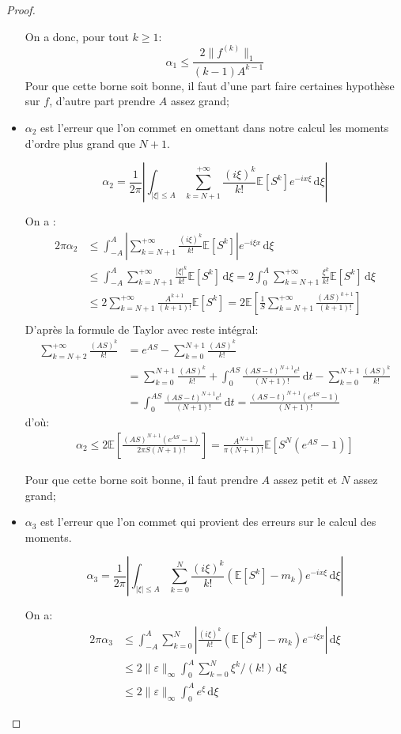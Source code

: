 \documentclass[12pt]{article}
\newcommand{\pth}[1]{\left(#1\right)}
\newcommand{\cro}[1]{\left[#1\right]}
\newcommand{\abs}[1]{\left|#1\right|}
\newcommand{\dabs}[1]{\|#1\|}
\newcommand{\de}{\,\mathrm{d}}
\newcommand{\Esp}[1]{\mathbb{E}\cro{#1}}
\begin{document}
\begin{proof}
\begin{itemize}
  On a donc, pour tout $k\geqslant 1$:
  \[\alpha_1\leqslant\frac{2\dabs{f^{(k)}}_{1}}{(k-1)A^{k-1}}\] Pour que cette borne soit bonne, il faut d'une part faire certaines hypothèse sur $f$, d'autre part prendre $A$ assez grand;
\item $\alpha_2$ est l'erreur que l'on commet en omettant dans notre calcul les moments d'ordre plus grand que $N+1$.

\[\alpha_2 = \frac1{2\pi}\abs{\int_{\abs{\xi}\leqslant A}\sum_{k=N+1}^{+\infty}\frac{(i\xi)^k}{k!}\Esp{S^k}e^{-ix\xi}\de\xi}\]

On a :
  \begin{align*}
    2\pi\alpha_2&\leqslant \int_{-A}^A\abs{\sum_{k=N+1}^{+\infty}\frac{(i\xi)^k}{k!}\Esp{S^k}}e^{-i\xi x}\de\xi\\
    &\leqslant  \int_{-A}^A\sum_{k=N+1}^{+\infty}\frac{\abs{\xi}^k}{k!}\Esp{S^k}\de\xi=2 \int_{0}^A\sum_{k=N+1}^{+\infty}\frac{\xi^k}{k!}\Esp{S^k}\de\xi\\
    &\leqslant 2\sum_{k=N+1}^{+\infty}\frac{A^{k+1}}{(k+1)!}\Esp{S^k}=2\Esp{\frac{1}{S}\sum_{k=N+1}^{+\infty}\frac{(AS)^{k+1}}{(k+1)!}}\\
  \end{align*}
  D'après la formule de Taylor avec reste intégral:
  \begin{align*}
    \sum_{k=N+2}^{+\infty}\frac{(AS)^{k}}{k!}&=e^{AS}-\sum_{k=0}^{N+1}\frac{(AS)^{k}}{k!}\\
    &=\sum_{k=0}^{N+1}\frac{(AS)^{k}}{k!}+\int_{0}^{AS}\frac{(AS-t)^{N+1}e^t}{(N+1)!}\de t-\sum_{k=0}^{N+1}\frac{(AS)^{k}}{k!}\\
    &=\int_{0}^{AS}\frac{(AS-t)^{N+1}e^t}{(N+1)!}\de t = \frac{(AS-t)^{N+1}(e^{AS}-1)}{(N+1)!}
  \end{align*}
  d'où:
  \begin{align*}
    \alpha_2\leqslant 2\Esp{\frac{(AS)^{N+1}(e^{AS}-1)}{2\pi S(N+1)!}}=\frac{A^{N+1}}{\pi(N+1)!}\Esp{S^N(e^{AS}-1)}
  \end{align*}

  Pour que cette borne soit bonne, il faut prendre $A$ assez petit et $N$ assez grand;
\item $\alpha_3$ est l'erreur que l'on commet qui provient des erreurs sur le calcul des moments.

\[\alpha_3 = \frac1{2\pi}\abs{\int_{\abs{\xi}\leqslant A}\sum_{k=0}^{N}\frac{(i\xi)^k}{k!}\pth{\Esp{S^k}-m_k}e^{-ix\xi}\de\xi}\]

On a:
  \begin{align*} 
    2\pi\alpha_3&\leqslant \int_{-A}^A\sum_{k=0}^{N}\abs{\frac{(i\xi)^k}{k!}\pth{\Esp{S^k}-m_k}e^{-i\xi x}}\de\xi\\
    &\leqslant 2\dabs{\varepsilon}_{\infty}\int_{0}^A\sum_{k=0}^{N}\xi^k/(k!)\de\xi\\
    &\leqslant 2\dabs{\varepsilon}_{\infty}\int_{0}^Ae^{\xi}\de\xi
  \end{align*}


\end{itemize}
\end{proof}
\end{document}
